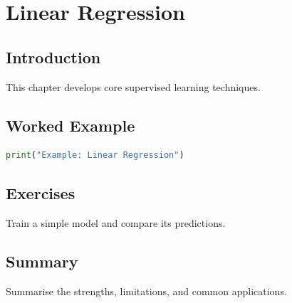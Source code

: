 \chapter{Linear Regression}
\label{chap:vol6-6}



\section{Introduction}
This chapter develops core supervised learning techniques.

\section{Worked Example}
\begin{lstlisting}[language=Python]
print("Example: Linear Regression")
\end{lstlisting}

\section{Exercises}
\begin{exercise}
Train a simple model and compare its predictions.
\end{exercise}

\section{Summary}
Summarise the strengths, limitations, and common applications.
